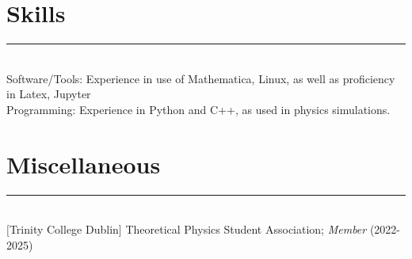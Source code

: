 \documentclass{article}
\begin{document}
\section*{Skills}
\hrule~\\
Software/Tools: Experience in use of Mathematica, Linux, as well as proficiency in Latex, Jupyter\\
Programming: Experience in Python and C++, as used in physics simulations.
\section*{Miscellaneous}
\hrule~\\
$[$Trinity College Dublin$]$ Theoretical Physics Student Association; \textit{Member} (2022-2025)
\end{document}
